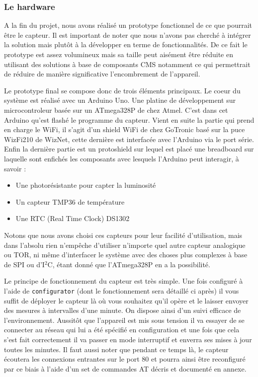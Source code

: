 		\subsubsection{Le hardware}
		\par
		A la fin du projet, nous avons réalisé un prototype fonctionnel de ce
		que pourrait être le capteur. Il est important de noter que nous n'avons
		pas cherché à intégrer la solution mais plutôt à la développer en terme
		de fonctionnalités. De ce fait le prototype est assez volumineux mais
		sa taille peut aisément être réduite en utilisant des solutions à base
		de composants CMS notamment ce qui permettrait de réduire de manière
		significative l'encombrement de l'appareil.
		\par
		Le prototype final se compose donc de trois éléments principaux. Le coeur
		du système est réalisé avec un Arduino Uno. Une platine de développement
		sur microcontroleur basée sur un ATmega328P de chez Atmel. C'est dans cet
		Arduino qu'est flashé le programme du capteur. Vient en suite la partie
		qui prend en charge le WiFi, il s'agit d'un shield WiFi de chez GoTronic
		basé sur la puce WizFi210 de WizNet, cette dernière est interfacée avec
		l'Arduino via le port série. Enfin la dernière partie est un protoshield
		sur lequel est placé une breadboard sur laquelle sont enfichés les composants
		avec lesquels l'Arduino peut interagir, à savoir :
		\begin{itemize}
			\item Une photorésistante pour capter la luminosité
			\item Un capteur TMP36 de température
			\item Une RTC (Real Time Clock) DS1302
		\end{itemize}
		Notons que nous avons choisi ces capteurs pour leur facilité d'utilisation,
		mais dans l'absolu rien n'empêche d'utiliser n'importe quel autre capteur
		analogique ou TOR, ni même d'interfacer le système avec des choses plus
		complexes à base de SPI ou d'I$^2$C, étant donné que l'ATmega328P en a
		la possibilité.
		\par
		Le principe de fonctionnement du capteur est très simple. Une fois configuré
		à l'aide de \texttt{configurator} (dont le fonctionnement sera détaillé ci après)
		il vous suffit de déployer le capteur là où vous souhaitez qu'il opère et le
		laisser envoyer des mesures à intervalles d'une minute. On dispose ainsi
		d'un suivi efficace de l'environnement. Aussitôt que l'appareil est
		mis sous tension il va essayer de se connecter au réseau qui lui a été
		spécifié en configuration et une fois que cela s'est fait correctement il
		va passer en mode interruptif et enverra ses mises à jour toutes les minutes.
		Il faut aussi noter que pendant ce temps là, le capteur écoutera les connexions
		entrantes sur le port 80 et pourra ainsi être reconfiguré par ce biais à l'aide
		d'un set de commandes AT décris et documenté en annexe.
		
